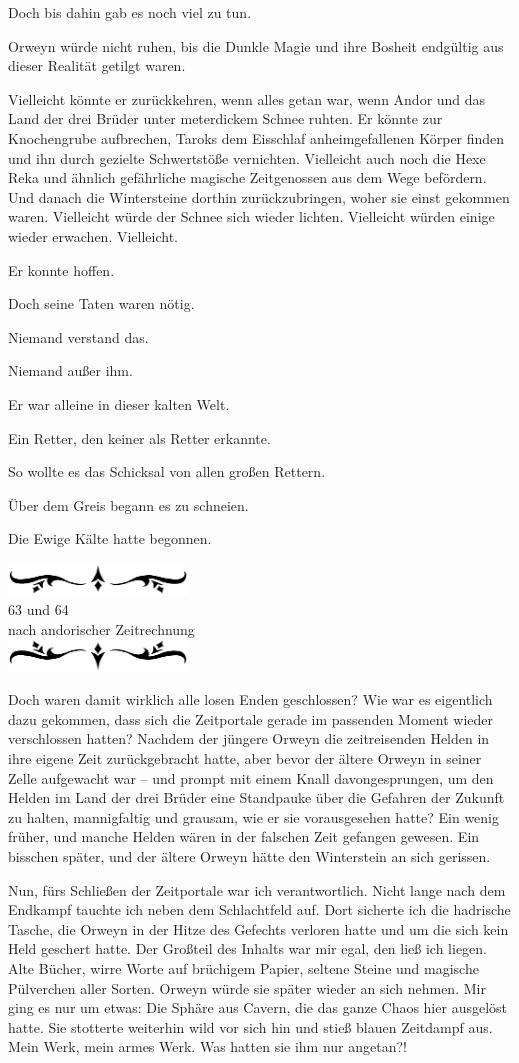 \documentclass[10pt, a4paper, oneside]{book}
\newcommand{\az}[1]{%
    \begin{center}
        \includegraphics[width=180px]{Das Erbe des Wunderkindes/verzierung1.png}\\
        {\Huge #1} \\
        {nach andorischer Zeitrechnung}\\
        \includegraphics[width=180px]{Das Erbe des Wunderkindes/verzierung2.png}
    \end{center}
    \extramarks{}{#1 a.Z.}
}
\begin{document}
Doch bis dahin gab es noch viel zu tun.

Orweyn würde nicht ruhen, bis die Dunkle Magie und ihre Bosheit endgültig aus dieser Realität getilgt waren. 

Vielleicht könnte er zurückkehren, wenn alles getan war, wenn Andor und das Land der drei Brüder unter meterdickem Schnee ruhten. Er könnte zur Knochengrube aufbrechen, Taroks dem Eisschlaf anheimgefallenen Körper finden und ihn durch gezielte Schwertstöße vernichten. Vielleicht auch noch die Hexe Reka und ähnlich gefährliche magische Zeitgenossen aus dem Wege befördern. Und danach die Wintersteine dorthin zurückzubringen, woher sie einst gekommen waren. Vielleicht würde der Schnee sich wieder lichten. Vielleicht würden einige wieder erwachen. Vielleicht. 

Er konnte hoffen.

Doch seine Taten waren nötig.

Niemand verstand das.

Niemand außer ihm.

Er war alleine in dieser kalten Welt.

Ein Retter, den keiner als Retter erkannte.

So wollte es das Schicksal von allen großen Rettern. 

Über dem Greis begann es zu schneien.

Die Ewige Kälte hatte begonnen.\bigskip

\az{63 und 64}

Doch waren damit wirklich alle losen Enden geschlossen? Wie war es eigentlich dazu gekommen, dass sich die Zeitportale gerade im passenden Moment wieder verschlossen hatten? Nachdem der jüngere Orweyn die zeitreisenden Helden in ihre eigene Zeit zurückgebracht hatte, aber bevor der ältere Orweyn in seiner Zelle aufgewacht war – und prompt mit einem Knall davongesprungen, um den Helden im Land der drei Brüder eine Standpauke über die Gefahren der Zukunft zu halten, mannigfaltig und grausam, wie er sie vorausgesehen hatte? Ein wenig früher, und manche Helden wären in der falschen Zeit gefangen gewesen. Ein bisschen später, und der ältere Orweyn hätte den Winterstein an sich gerissen. \bigskip

Nun, fürs Schließen der Zeitportale war ich verantwortlich. Nicht lange nach dem Endkampf tauchte ich neben dem Schlachtfeld auf. Dort sicherte ich die hadrische Tasche, die Orweyn in der Hitze des Gefechts verloren hatte und um die sich kein Held geschert hatte. Der Großteil des Inhalts war mir egal, den ließ ich liegen. Alte Bücher, wirre Worte auf brüchigem Papier, seltene Steine und magische Pülverchen aller Sorten. Orweyn würde sie später wieder an sich nehmen. Mir ging es nur um etwas: Die Sphäre aus Cavern, die das ganze Chaos hier ausgelöst hatte. Sie stotterte weiterhin wild vor sich hin und stieß blauen Zeitdampf aus. Mein Werk, mein armes Werk. Was hatten sie ihm nur angetan?! 
\end{document}
